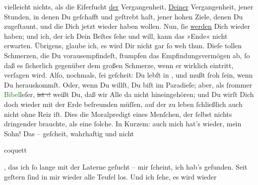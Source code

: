 \documentclass[twoside=false,titlepage=false,open=any, parskip=never, fontsize=12pt, headings=small, chapterprefix=false, appendixprefix=false]{scrbook}
\newcommand{\strikeout}[1]{\sout{#1}}
\newcommand{\pbposition}{\depth}
\newcommand{\pb}{\nobreak\hspace{0pt}\raisebox{-0.1em}{\raisebox{\pbposition}{\textnormal{|}}}\nobreak\hspace{0pt}}
\begin{document}
               vielleicht nichts, als die Eiferſucht \uline{der}
               Vergangenheit, \uline{Deiner} Vergangenheit, jener Stunden,
               in denen Du geſchafft und geſtrebt haſt, jener hohen Ziele, denen Du zugeſtaunt, und
               die Dich jetzt wieder haben wollen. Nun, ſie \uline{werden}
               Dich wieder haben; und ich, der ich Dein Beſtes ſehe und will, kann das »Ende« nicht
               erwarten. Übrigens, glaube ich, es wird Dir nicht gar ſo weh thun. Dieſe tollen
               Schmerzen, die Du vorausempfindeſt, {\pb}ſtumpfen das Empfindungsvermögen ab, ſo daß es ſicherlich gegenüber dem großen
               Schmerze, wenn er wirklich eintritt, verſagen wird. Alſo, nochmals, ſei geſcheit: Du
               lebſt in \label{K_L02649-7v}\label{K_L02649-7h},
               und mußt ſroh ſein, wenn Du herauskommſt. Oder, wenn Du willſt, Du biſt im Paradieſe;
               aber, als ſrommer \textcolor{green}{Bibel}{}\ledrightnote{\textcolor{green}{Bibel}}leſer, \strikeout{ist \textcolor{gray}{d}} weißt Du, daß wir Alle da nicht hineingehören; und Du wirſt Dich doch wieder
               mit der Erde beſreunden müſſen, auf der zu leben ſchließlich auch nicht ohne Reiz
               iſt.\pend
           \pstart
           Dies die Moralpredigt eines Menſchen, der ſelbst nichts dringender brauchte, als eine
               ſolche. In Kurzem: auch mich hat’s wieder, mein Sohn! Das \label{K_L02649-2v}\label{K_L02649-2h} – geſcheit,
               wahrhaftig und nicht \begin{otherlanguage}{french}coquett\end{otherlanguage}, das ich ſo lange mit
               der Laterne geſucht – mir ſcheint, ich hab’s gefunden. Seit geſtern ſind in mir wieder alle Teufel los. Und ich ſehe, es wird wieder
\end{document}

